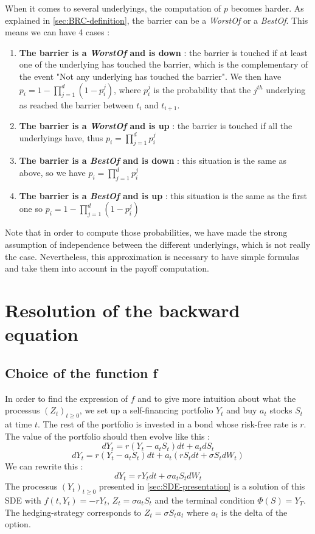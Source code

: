 \documentclass[a4paper,11pt,english]{book}
\begin{document}
When it comes to several underlyings, the computation of $p$ becomes harder. As explained in \ref{sec:BRC-definition}, the barrier can be a \textit{WorstOf} or a \textit{BestOf}. This means we can have 4 cases :
\begin{enumerate}
    \item \textbf{The barrier is a \textit{WorstOf} and is down} : the barrier is touched if at least one of the underlying has touched the barrier, which is the complementary of the event "Not any underlying has touched the barrier". We then have $p_{i}=1-\prod_{j=1}^{d}(1-p_{i}^{j})$, where $p_{i}^{j}$ is the probability that the $j^{th}$ underlying as reached the barrier between $t_{i}$ and $t_{i+1}$.
    
    \item \textbf{The barrier is a \textit{WorstOf} and is up} : the barrier is touched if all the underlyings have, thus $p_{i}=\prod_{j=1}^{d}p_{i}^{j}$
    
    \item \textbf{The barrier is a \textit{BestOf} and is down} : this situation is the same as above, so we have $p_{i}=\prod_{j=1}^{d}p_{i}^{j}$
    
    \item \textbf{The barrier is a \textit{BestOf} and is up} : this situation is the same as the first one so  $p_{i}=1-\prod_{j=1}^{d}(1-p_{i}^{j})$
\end{enumerate}
Note that in order to compute those probabilities, we have made the strong assumption of independence between the different underlyings, which is not really the case. Nevertheless, this approximation is necessary to have simple formulas and take them into account in the payoff computation.
\section{Resolution of the backward equation}
\subsection{Choice of the function f}
\label{subsec:choice-of-f}
In order to find the expression of $f$ and to give more intuition about what the processus $(Z_{t})_{t\geq0}$, we set up a self-financing portfolio $Y_{t}$ and buy $a_{t}$ stocks $S_{t}$ at time $t$. The rest of the portfolio is invested in a bond whose risk-free rate is $r$. The value of the portfolio should then evolve like this :
$$dY_{t} = r(Y_{t}-a_{t}S_{t})dt + a_{t}dS_{t}$$
$$dY_{t} = r(Y_{t}-a_{t}S_{t})dt + a_{t}(rS_{t}dt+\sigma S_{t}dW_{t})$$
We can rewrite this :
$$dY_{t} = rY_{t}dt + \sigma a_{t}S_{t}dW_{t}$$
The processus $(Y_{t})_{t\geq0}$ presented in \ref{sec:SDE-presentation} is a solution of this SDE with $f(t,Y_{t})=-rY_{t}$, $Z_{t} = \sigma a_{t}S_{t}$ and the terminal condition $\Phi(S)=Y_{T}$.
The hedging-strategy corresponds to $Z_{t}=\sigma S_{t} a_{t}$ where $a_{t}$ is the delta of the option. 
\end{document}
